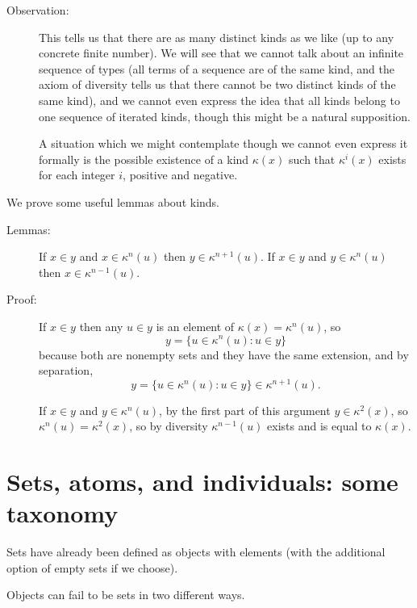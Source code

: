 \documentclass[12pt]{article}
\begin{document}
\begin{description}
\item[Observation:]  This tells us that there are as many distinct kinds as we like (up to any concrete finite number).  We will see that we cannot talk about an infinite sequence of types (all terms of a sequence are of the same kind, and the axiom of diversity tells us that there cannot be two distinct kinds of the same kind), and we cannot even express the idea that all kinds belong to one sequence of iterated kinds, though this might be a natural supposition.

A situation which we might contemplate though we cannot even express it formally is the possible existence of a kind $\kappa(x)$ such that $\kappa^i(x)$ exists for each integer $i$, positive and negative.

\end{description}

We prove some useful lemmas about kinds.

\begin{description}

\item[Lemmas:]  If $x \in y$ and $x \in \kappa^n(u)$ then $y \in \kappa^{n+1}(u)$.  If $x \in y$ and $y \in \kappa^n(u)$ then $x \in \kappa^{n-1}(u)$.

\item[Proof:]  If $x \in y$ then any $u \in y$ is an element of $\kappa(x)=\kappa^n(u)$, so $$y = \{u \in \kappa^n(u):u \in y\}$$ because both are nonempty sets and they have the same extension, and by separation, $$y=\{u \in \kappa^n(u):u \in y\} \in \kappa^{n+1}(u).$$

If $x \in y$ and $y \in \kappa^n(u)$, by the first part of this argument $y \in \kappa^2(x)$, so $\kappa^n(u)=\kappa^2(x)$, so by diversity $\kappa^{n-1}(u)$ exists and is equal to $\kappa(x)$.

\newpage



\end{description}

\newpage

\section{Sets, atoms, and individuals: some taxonomy}

Sets have already been defined as objects with elements (with the additional option of empty sets if we choose).

Objects can fail to be sets in two different ways.
\end{document}

